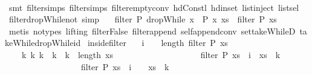 \begin{isabellebody}
%
\isadelimproof
\ \ %
\endisadelimproof
%
\isatagproof
{}\isamarkupfalse%
\ {\isacharparenleft}smt\ filter{\isachardot}simps{\isacharparenleft}{}{\isacharparenright}\ filter{\isachardot}simps{\isacharparenleft}{}{\isacharparenright}\ filter{\isacharunderscore}empty{\isacharunderscore}conv\ hd{\isacharunderscore}Cons{\isacharunderscore}tl\ hd{\isacharunderscore}in{\isacharunderscore}set\ list{\isachardot}inject\ list{\isachardot}sel{\isacharparenleft}{}{\isacharparenright}{\isacharparenright}%
\endisatagproof
{\isafoldproof}%
%
\isadelimproof
\isanewline
%
\endisadelimproof
\isanewline
{}\isamarkupfalse%
\ filter{\isacharunderscore}dropWhile{\isacharunderscore}not\ {\isacharbrackleft}simp{\isacharbrackright}{\isacharcolon}\isanewline
\ \ \ {\isachardoublequoteopen}filter\ P\ {\isacharparenleft}dropWhile\ {\isacharparenleft}{\isasymlambda}x{\isachardot}\ {\isasymnot}\ P\ x{\isacharparenright}\ xs{\isacharparenright}\ {\isacharequal}\ filter\ P\ xs{\isachardoublequoteclose}\isanewline
%
\isadelimproof
\ \ %
\endisadelimproof
%
\isatagproof
{}\isamarkupfalse%
\ {\isacharparenleft}metis\ {\isacharparenleft}no{\isacharunderscore}types{\isacharcomma}\ lifting{\isacharparenright}\ filter{\isacharunderscore}False\ filter{\isacharunderscore}append\ self{\isacharunderscore}append{\isacharunderscore}conv{}\ set{\isacharunderscore}takeWhileD\ takeWhile{\isacharunderscore}dropWhile{\isacharunderscore}id{\isacharparenright}%
\endisatagproof
{\isafoldproof}%
%
\isadelimproof
\isanewline
%
\endisadelimproof
\isanewline
{}\isamarkupfalse%
\ inside{\isacharunderscore}filter{\isacharcolon}\isanewline
\ \ \ {\isachardoublequoteopen}i\ {\isacharplus}\ {}\ {\isacharless}\ length\ {\isacharparenleft}filter\ P\ xs{\isacharparenright}{\isachardoublequoteclose}\isanewline
\ \ \ {\isachardoublequoteopen}{\isasymexists}\ k{}\ k{}{\isachardot}\ k{}\ {\isacharless}\ k{}\ {\isasymand}\ k{}\ {\isacharless}\ length\ xs\ {\isasymand}\ \isanewline
\ \ \ \ \ \ \ \ \ \ \ \ \ \ \ \ \ \ {\isacharparenleft}filter\ P\ xs{\isacharparenright}\ {\isacharbang}\ i\ {\isacharequal}\ xs\ {\isacharbang}\ k{}\ {\isasymand}\ \isanewline
\ \ \ \ \ \ \ \ \ \ \ \ \ \ \ \ \ \ {\isacharparenleft}filter\ P\ xs{\isacharparenright}\ {\isacharbang}\ {\isacharparenleft}i\ {\isacharplus}\ {}{\isacharparenright}\ {\isacharequal}\ xs\ {\isacharbang}\ k{}\ {\isasymand}\ \isanewline

\end{isabellebody}
